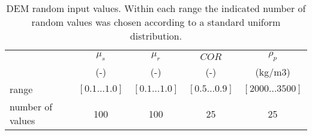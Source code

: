 \documentclass{CFD2015}
\begin{document}
\begin{table*}%
\centering
\begin{tabular}{lcccc}
\hline
 &  $\mu_s$ & $\mu_r$ & $COR$ & $\rho_p$  \\
   &	(-)  & (-)   & (-)   & (kg/m3) \\
          \hline
    range & $[0.1 \ldots 1.0]$ & $[0.1 \ldots 1.0]$ & $[0.5 \ldots 0.9]$ &
    $[2000 \ldots 3500]$     \\
    number of values & 100   & 100   & 25    & 25    \\

\hline
\end{tabular}
\caption[DEM random input values]{DEM random input values. Within each range the
indicated number of random values was chosen according to a standard uniform
distribution.}
\label{tab:12DEMRandominputvalues}
\end{table*}
\end{document}
